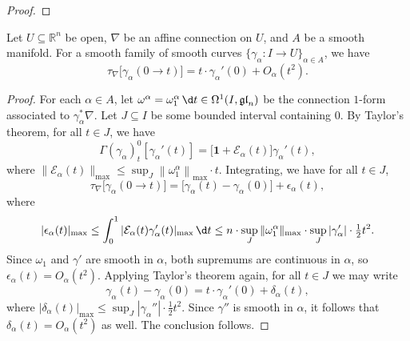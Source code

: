 \begin{proof}

\end{proof}

\begin{lemma}
  Let $U \subseteq \mathbb{R}^n$ be open, $\nabla$ be an affine connection on $U$, and $A$ be a smooth manifold. For a smooth family of smooth curves $\{\gamma_\alpha \colon I \to U\}_{\alpha \in A}$, we have
  \begin{equation}
    \tau_\nabla\Big[\gamma_\alpha(0 \to t)\Big] = t \cdot \gamma_\alpha'(0) + O_\alpha(t^2).
  \end{equation}
\end{lemma}
\begin{proof}
For each $\alpha \in A$, let $\omega^\alpha =  \omega^\alpha_1\, \d t \in \Omega^1(I, \mathfrak{gl}_n)$ be the connection $1$-form associated to $\gamma_\alpha^* \nabla$. Let $J \subseteq I$ be some bounded interval containing $0$. By Taylor's theorem, for all $t \in J$, we have 
\begin{equation}
  \Gamma(\gamma_\alpha)_{t}^{0} \left[\gamma_\alpha'(t)\right] = \Big[\mathbf{1} + \mathcal{E}_\alpha(t)\Big] \gamma_\alpha'(t),
\end{equation}
where $\lVert\mathcal{E}_\alpha(t)\rVert_{\max} \leq \sup_{J} \left\lVert \omega^\alpha_1 \right\rVert _{\max} \cdot t$. Integrating, we have for all $t \in J$,
\begin{equation}
  \tau_\nabla\Big[\gamma_\alpha(0 \to t)\Big] = \big[\gamma_\alpha(t) - \gamma_\alpha(0)\big] + \epsilon_\alpha(t),
\end{equation}
where 
\begin{equation}
|\epsilon_\alpha(t)|_{\max} \leq \int_{0}^{1} |\mathcal{E}_\alpha(t) \gamma_\alpha'(t)|_{\max} \, \d t \leq  n \cdot \sup_{J}{\lVert \omega^\alpha_1 \rVert_{\max}} \cdot \sup_{J} |\gamma_\alpha'| \cdot \tfrac{1}{2}t^2.
\end{equation}
Since $\omega_1$ and $\gamma'$ are smooth in $\alpha$, both supremums are continuous in $\alpha$, so $\epsilon_\alpha(t) = O_\alpha(t^2)$. Applying Taylor's theorem again, for all $t \in J$ we may write
\begin{equation}
  \gamma_\alpha(t) - \gamma_\alpha(0) = t \cdot \gamma_\alpha'(0) + \delta_\alpha(t),
\end{equation}
where $|\delta_\alpha(t)|_{\max} \leq \sup_J |\gamma_\alpha''| \cdot \tfrac{1}{2} t^2$. Since $\gamma''$ is smooth in $\alpha$, it follows that $\delta_\alpha(t) = O_\alpha(t^2)$ as well. The conclusion follows.
\end{proof}


